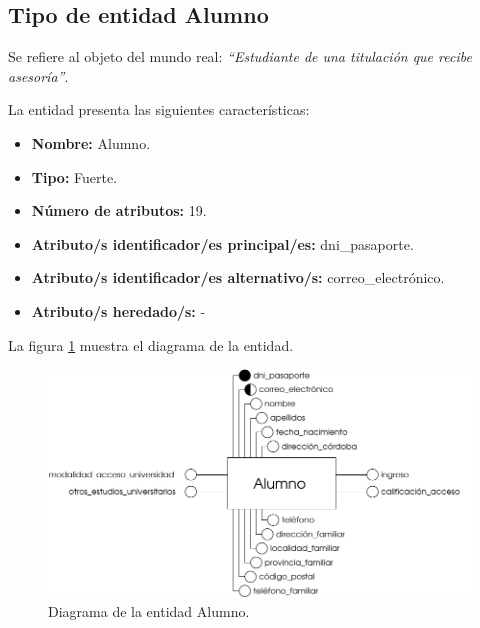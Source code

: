 \subsection{Tipo de entidad Alumno}

   \begin{description}

   \item[Definición] Se refiere al objeto del mundo real: \emph{``Estudiante de
        una titulación que recibe asesoría''}.

   \item[Características] La entidad presenta las siguientes características:
      \begin{itemize}
         \item \textbf{Nombre:} Alumno.
         \item \textbf{Tipo:} Fuerte.
         \item \textbf{Número de atributos:} 19.
         \item \textbf{Atributo/s identificador/es principal/es:} dni\_pasaporte.
         \item \textbf{Atributo/s identificador/es alternativo/s:} correo\_electrónico.
         \item \textbf{Atributo/s heredado/s:} -
      \end{itemize}

   \item[Diagrama] La figura \ref{diagramaAlumno} muestra el diagrama de la entidad.
   \item \begin{figure}[!ht]
            \begin{center}
            \includegraphics[]{07.Modelo_Entidad-Interrelacion/7.2.Analisis_Entidades/diagramas/alumno.pdf}
            \caption{Diagrama de la entidad Alumno.}
            \label{diagramaAlumno}
            \end{center}
         \end{figure}


\end{description}
